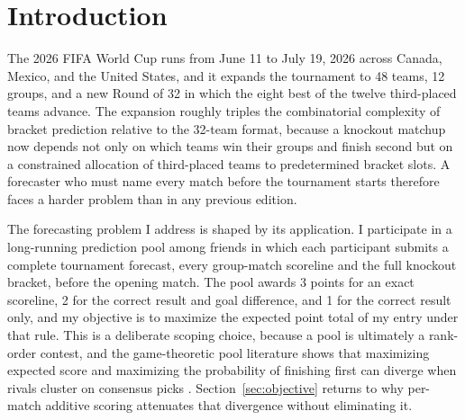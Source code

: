 \documentclass[11pt,letterpaper]{article}
\begin{document}

\section{Introduction}

The 2026 FIFA World Cup runs from June 11 to July 19, 2026 across Canada, Mexico, and the United States, and it expands the tournament to 48 teams, 12 groups, and a new Round of 32 in which the eight best of the twelve third-placed teams advance. The expansion roughly triples the combinatorial complexity of bracket prediction relative to the 32-team format, because a knockout matchup now depends not only on which teams win their groups and finish second but on a constrained allocation of third-placed teams to predetermined bracket slots. A forecaster who must name every match before the tournament starts therefore faces a harder problem than in any previous edition.

The forecasting problem I address is shaped by its application. I participate in a long-running prediction pool among friends in which each participant submits a complete tournament forecast, every group-match scoreline and the full knockout bracket, before the opening match. The pool awards 3 points for an exact scoreline, 2 for the correct result and goal difference, and 1 for the correct result only, and my objective is to maximize the expected point total of my entry under that rule. This is a deliberate scoping choice, because a pool is ultimately a rank-order contest, and the game-theoretic pool literature shows that maximizing expected score and maximizing the probability of finishing first can diverge when rivals cluster on consensus picks \citep{clairletscher2007}. Section~\ref{sec:objective} returns to why per-match additive scoring attenuates that divergence without eliminating it.
\end{document}
